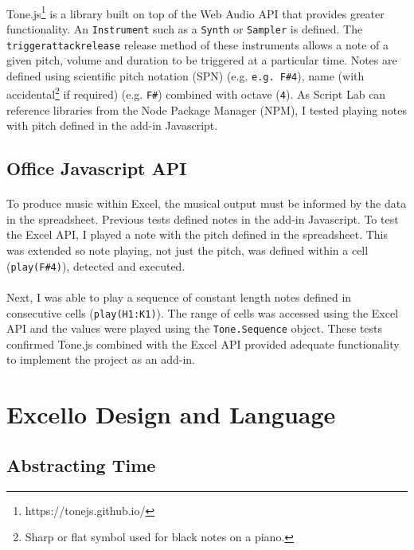 \paragraph{} Tone.js\footnote{https://tonejs.github.io/} is a library built on top of the Web Audio API that provides greater functionality. An \texttt{Instrument} such as a \texttt{Synth} or \texttt{Sampler} is defined. The \texttt{triggerattackrelease} release method of these instruments allows a note of a given pitch, volume and duration to be triggered at a particular time. Notes are defined using scientific pitch notation (SPN) (e.g. \texttt{e.g. F\#4}), name (with accidental\footnote{Sharp or flat symbol used for black notes on a piano.} if required) (e.g. \texttt{F\#}) combined with octave (\texttt{4}). As Script Lab can reference libraries from the Node Package Manager (NPM), I tested playing notes with pitch defined in the add-in Javascript.

\subsection{Office Javascript API}

\paragraph{} To produce music within Excel, the musical output must be informed by the data in the spreadsheet. Previous tests defined notes in the add-in Javascript. To test the Excel API, I played a note with the pitch defined in the spreadsheet. This was extended so note playing, not just the pitch, was defined within a cell (\texttt{play(F\#4)}), detected and executed.

\paragraph{} Next, I was able to play a sequence of constant length notes defined in consecutive cells (\texttt{play(H1:K1)}). The range of cells was accessed using the Excel API and the values were played using the \texttt{Tone.Sequence} object. These tests confirmed Tone.js combined with the Excel API provided adequate functionality to implement the project as an add-in.

\section{Excello Design and Language}

\subsection{Abstracting Time}

